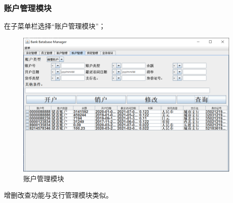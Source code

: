 \documentclass{ctexart}
\begin{document}
\subsubsection{\hei 账户管理模块}
在子菜单栏选择“账户管理模块”；
\par 
\begin{figure}[H]
    \centering
    \includegraphics[scale=0.2]{zhanghu.png}
    \caption{账户管理模块}
\end{figure}
增删改查功能与支行管理模块类似。
\end{document}
